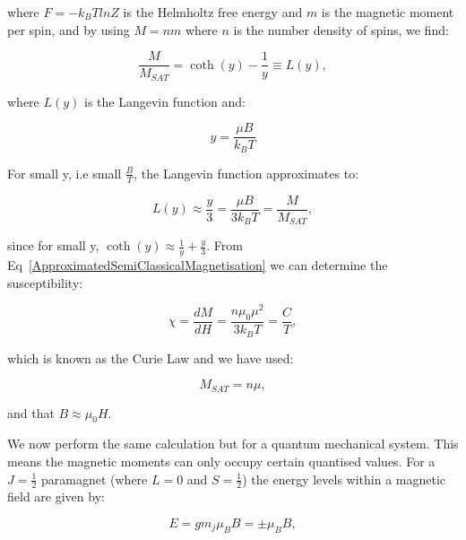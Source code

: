 \noindent where $F = -k_B T lnZ$ is the Helmholtz free energy and $m$ is the magnetic moment per spin, and by using $M = nm$ where $n$ is the number density of spins, we find:

\begin{equation}
    \frac{M}{M_{SAT}} = \coth(y) - \frac{1}{y} \equiv L(y),
    \label{SemiClassicalMagnetisation}
\end{equation}

\noindent where $L(y)$ is the Langevin function and:

\begin{equation}
    y = \frac{\mu B}{k_B T}
    \label{SemiClassicalY}
\end{equation}

\noindent For small y, i.e small $\frac{B}{T}$, the Langevin function approximates to:

\begin{equation}
    L(y) \approx \frac{y}{3} = \frac{\mu B}{3 k_B T} = \frac{M}{M_{SAT}},
    \label{ApproximatedSemiClassicalMagnetisation}
\end{equation}

\noindent since for small y, $\coth(y) \approx \frac{1}{y} + \frac{y}{3}$. From Eq~\ref{ApproximatedSemiClassicalMagnetisation} we can determine the susceptibility:

\begin{equation}
    \chi = \frac{dM}{dH} = \frac{n \mu_0 \mu^2}{3 k_B T} = \frac{C}{T},
    \label{SemiClassicalySusceptibility}
\end{equation}

\noindent which is known as the Curie Law and we have used:

\begin{equation}
    M_{SAT} = n \mu,
    \label{SemiClassicalSaturatedMagnetisation}
\end{equation}

\noindent and that $B \approx \mu_0 H$.

\noindent We now perform the same calculation but for a quantum mechanical system. This means the magnetic moments can only occupy certain quantised values. For a $J=\frac{1}{2}$ paramagnet (where $L=0$ and $S=\frac{1}{2}$) the energy levels within a magnetic field are given by:

\begin{equation}
    E = g m_j \mu_B B = \pm \mu_B B,
    \label{EnergyLevelsHalfParamagnet}
\end{equation}

